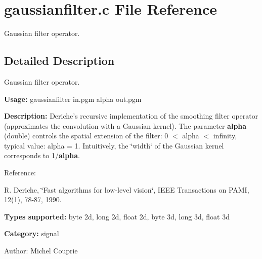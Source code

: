 \section{gaussianfilter.c File Reference}
\label{gaussianfilter_8c}
Gaussian filter operator. 



\subsection{Detailed Description}
Gaussian filter operator. 

{\bf Usage:} gaussianfilter in.pgm alpha out.pgm

{\bf Description:} Deriche's recursive implementation of the smoothing filter operator (approximates the convolution with a Gaussian kernel). The parameter {\bf alpha} (double) controls the spatial extension of the filter: 0 $<$ alpha $<$ infinity, typical value: alpha = 1. Intuitively, the \char`\"{}width\char`\"{} of the Gaussian kernel corresponds to 1/{\bf alpha}.

Reference:\par
 [Der90] R. Deriche, \char`\"{}Fast algorithms for low-level vision\char`\"{}, IEEE Transactions on PAMI, 12(1), 78-87, 1990.\par


{\bf Types supported:} byte 2d, long 2d, float 2d, byte 3d, long 3d, float 3d

{\bf Category:} signal

\begin{Desc}
\item[Author:]Michel Couprie \end{Desc}
